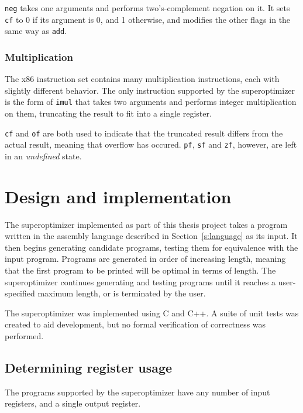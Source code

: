 \documentclass[a4paper,11pt]{kth-mag}
\begin{document}
\verb|neg| takes one arguments and performs two's-complement negation on it.
It sets \verb|cf| to 0 if its argument is 0, and 1 otherwise, and modifies the other flags in the same way as \verb|add|.

\subsection{Multiplication}

The x86 instruction set contains many multiplication instructions, each with slightly different behavior.
The only instruction supported by the superoptimizer is the form of \verb|imul| that takes two arguments and performs integer multiplication on them, truncating the result to fit into a single register.

\verb|cf| and \verb|of| are both used to indicate that the truncated result differs from the actual result, meaning that overflow has occured.
\verb|pf|, \verb|sf| and \verb|zf|, however, are left in an \emph{undefined} state.

\chapter{Design and implementation}
\label{ch:design_implementation}

The superoptimizer implemented as part of this thesis project takes a program written in the assembly language described in Section~\ref{s:language} as its input.
It then begins generating candidate programs, testing them for equivalence with the input program.
Programs are generated in order of increasing length, meaning that the first program to be printed will be optimal in terms of length.
The superoptimizer continues generating and testing programs until it reaches a user-specified maximum length, or is terminated by the user.


The superoptimizer was implemented using C and C++.
A suite of unit tests was created to aid development, but no formal verification of correctness was performed.

\section{Determining register usage}


The programs supported by the superoptimizer have any number of input registers, and a single output register.
\end{document}
